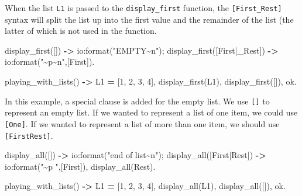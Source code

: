 \documentclass[
]{book}
\newenvironment{Shaded}{\begin{snugshade}}{\end{snugshade}}
\newcommand{\CharTok}[1]{\textcolor[rgb]{0.31,0.60,0.02}{#1}}
\newcommand{\DecValTok}[1]{\textcolor[rgb]{0.00,0.00,0.81}{#1}}
\newcommand{\FunctionTok}[1]{\textcolor[rgb]{0.00,0.00,0.00}{#1}}
\newcommand{\OperatorTok}[1]{\textcolor[rgb]{0.81,0.36,0.00}{\textbf{#1}}}
\newcommand{\StringTok}[1]{\textcolor[rgb]{0.31,0.60,0.02}{#1}}
\newcommand{\VariableTok}[1]{\textcolor[rgb]{0.00,0.00,0.00}{#1}}
\begin{document}
When the list \texttt{L1} is passed to the \texttt{display\_first} function, the \texttt{{[}First\textbar{}\_Rest{]}} syntax will split the list up into the first value and the remainder of the list (the latter of which is not used in the function.

\begin{Shaded}
\begin{Highlighting}[]
\FunctionTok{display\_first([])} \OperatorTok{{-}\textgreater{}}
    \FunctionTok{io:format(}\StringTok{"EMPTY\textasciitilde{}n"}\FunctionTok{);}
\FunctionTok{display\_first([}\VariableTok{First}\FunctionTok{|}\VariableTok{\_Rest}\FunctionTok{])} \OperatorTok{{-}\textgreater{}}
    \FunctionTok{io:format(}\StringTok{"\textasciitilde{}p\textasciitilde{}n"}\FunctionTok{,[}\VariableTok{First}\FunctionTok{]).}

\FunctionTok{playing\_with\_lists()} \OperatorTok{{-}\textgreater{}}
    \VariableTok{L1} \OperatorTok{=} \FunctionTok{[}\DecValTok{1}\FunctionTok{,} \DecValTok{2}\FunctionTok{,} \DecValTok{3}\FunctionTok{,} \DecValTok{4}\FunctionTok{],}
    \FunctionTok{display\_first(}\VariableTok{L1}\FunctionTok{),}   
    \FunctionTok{display\_first([]),}
    \CharTok{ok}\FunctionTok{.}
\end{Highlighting}
\end{Shaded}

In this example, a special clause is added for the empty list. We use \texttt{{[}{]}} to represent an empty list. If we wanted to represent a list of one item, we could use \texttt{{[}One{]}}. If we wanted to represent a list of more than one item, we should use \texttt{{[}First\textbar{}Rest{]}}.

\begin{Shaded}
\begin{Highlighting}[]
\FunctionTok{display\_all([])} \OperatorTok{{-}\textgreater{}}
    \FunctionTok{io:format(}\StringTok{"end of list\textasciitilde{}n"}\FunctionTok{);}
\FunctionTok{display\_all([}\VariableTok{First}\FunctionTok{|}\VariableTok{Rest}\FunctionTok{])} \OperatorTok{{-}\textgreater{}}
    \FunctionTok{io:format(}\StringTok{"\textasciitilde{}p "}\FunctionTok{,[}\VariableTok{First}\FunctionTok{]),}
    \FunctionTok{display\_all(}\VariableTok{Rest}\FunctionTok{).}

\FunctionTok{playing\_with\_lists()} \OperatorTok{{-}\textgreater{}}
    \VariableTok{L1} \OperatorTok{=} \FunctionTok{[}\DecValTok{1}\FunctionTok{,} \DecValTok{2}\FunctionTok{,} \DecValTok{3}\FunctionTok{,} \DecValTok{4}\FunctionTok{],}
    \FunctionTok{display\_all(}\VariableTok{L1}\FunctionTok{),}   
    \FunctionTok{display\_all([]),}
    \CharTok{ok}\FunctionTok{.}
\end{Highlighting}
\end{Shaded}
\end{document}
